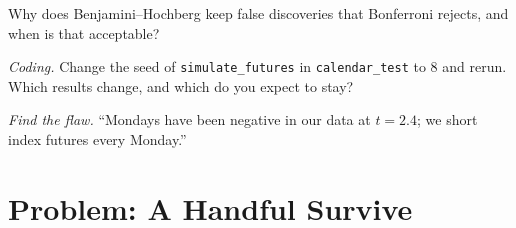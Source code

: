 \begin{exercise}[$\star\star$]\label{exo:s1:seasonality-and-calendar-effects:6}
Why does Benjamini--Hochberg keep false discoveries that Bonferroni rejects, and when is that acceptable?
\end{exercise}

\begin{exercise}[$\star\star\star$]\label{exo:s1:seasonality-and-calendar-effects:7}
\emph{Coding.} Change the seed of \texttt{simulate\_futures} in \texttt{calendar\_test} to 8 and rerun. Which results change, and which do you expect to
stay?
\end{exercise}

\begin{exercise}[$\star\star\star$]\label{exo:s1:seasonality-and-calendar-effects:8}
\emph{Find the flaw.} ``Mondays have been negative in our data at $t = 2.4$; we short index futures every Monday.''
\end{exercise}

\section{Problem: A Handful Survive}

